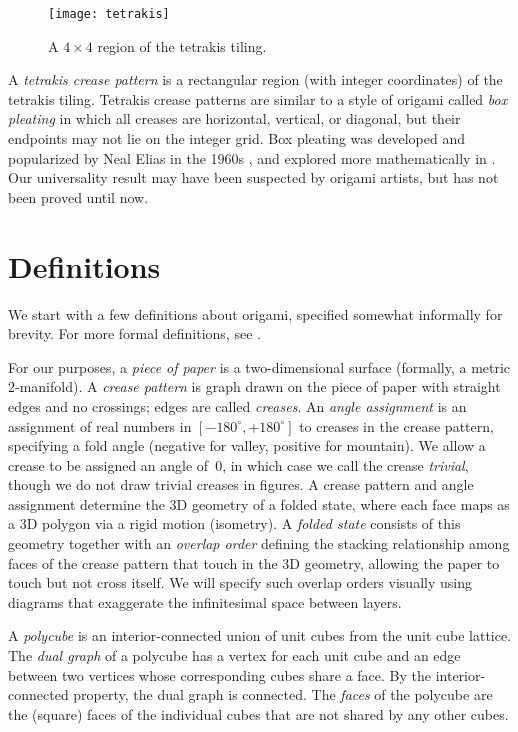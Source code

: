 \documentclass[11pt]{article}
\newcommand{\figlab}[1]{\label{fig:#1}}
\begin{document}
\begin{figure}
  \centering
  \texttt{[image: tetrakis]}
  \caption{A $4 \times 4$ region of the tetrakis tiling.}
  \figlab{tetrakis}
\end{figure}

A \emph{tetrakis crease pattern} is a rectangular region (with integer
coordinates) of the tetrakis tiling.
Tetrakis crease patterns are similar to a style of origami
called \emph{box pleating} in which all creases are horizontal,
vertical, or diagonal, but their endpoints may not lie on the integer grid.
Box pleating was developed and popularized by Neal Elias in the 1960s
\cite{Kirschenbaum-Elias}, and explored more mathematically in
\cite{Lang-2003-secrets}.
Our universality result may have been suspected by origami artists,
but has not been proved until now.


\section{Definitions}

We start with a few definitions about origami,
specified somewhat informally for brevity.
For more formal definitions, see \cite[ch.~11]{Demaine-O'Rourke-2007}.

For our purposes, a \emph{piece of paper} is a two-dimensional surface
(formally, a metric 2-manifold).
A \emph{crease pattern} is graph drawn on the piece of paper
with straight edges and no crossings; edges are called \emph{creases}.
An \emph{angle assignment} is an assignment of real numbers in
$[-180^\circ,+180^\circ]$ to creases in the crease pattern,
specifying a fold angle (negative for valley, positive for mountain).
We allow a crease to be assigned an angle of~$0$,
in which case we call the crease \emph{trivial},
though we do not draw trivial creases in figures.
A crease pattern and angle assignment determine the 3D geometry of a folded
state, where each face maps as a 3D polygon via a rigid motion (isometry).
A \emph{folded state} consists of this geometry together with an
\emph{overlap order} defining the stacking relationship among faces of the
crease pattern that touch in the 3D geometry, allowing the paper to touch
but not cross itself.
We will specify such overlap orders visually using diagrams
that exaggerate the infinitesimal space between layers.

A \emph{polycube} is an interior-connected union of unit cubes from the
unit cube lattice.  The \emph{dual graph} of a polycube has a vertex
for each unit cube and an edge between two vertices whose corresponding
cubes share a face.
By the interior-connected property, the dual graph is connected.
The \emph{faces} of the polycube are the (square) faces of the individual cubes
that are not shared by any other cubes.
\end{document}
